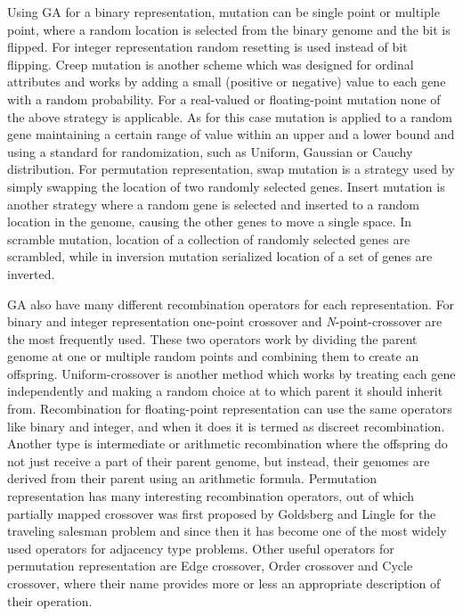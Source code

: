 Using GA for a binary representation, mutation can be single point or multiple point, where a random location is selected from the binary genome and the bit is flipped. For integer representation random resetting is used instead of bit flipping. Creep mutation is another scheme which was designed for ordinal attributes and works by adding a small (positive or negative) value to each gene with a random probability. For a real-valued or floating-point mutation none of the above strategy is applicable. As for this case mutation is applied to a random gene maintaining a certain range of value within an upper and a lower bound and using a standard for randomization, such as Uniform, Gaussian or Cauchy distribution. For permutation representation, swap mutation is a strategy used by simply swapping the location of two randomly selected genes. Insert mutation is another strategy where a random gene is selected and inserted to a random location in the genome, causing the other genes to move a single space. In scramble mutation, location of a collection of randomly selected genes are scrambled, while in inversion mutation serialized location of a set of genes are inverted. 

GA also have many different recombination operators for each representation. For binary and integer representation one-point crossover and \textit{N}-point-crossover are the most frequently used. These two operators work by dividing the parent genome at one or multiple random points and combining them to create an offspring. Uniform-crossover \cite{sywerda1989} is another method which works by treating each gene independently and making a random choice at to which parent it should inherit from. Recombination for floating-point representation can use the same operators like binary and integer, and when it does it is termed as discreet recombination. Another type is intermediate or arithmetic recombination where the offspring do not just receive a part of their parent genome, but instead, their genomes are derived from their parent using an arithmetic formula. Permutation representation has many interesting recombination operators, out of which partially mapped crossover was first proposed by Goldsberg and Lingle \cite{goldberg1985} for the traveling salesman problem and since then it has become one of the most widely used operators for adjacency type problems. Other useful operators for permutation representation are Edge crossover, Order crossover and Cycle crossover, where their name provides more or less an appropriate description of their operation.

